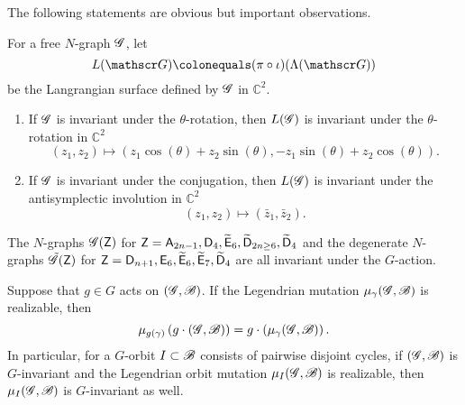 The following statements are obvious but important observations.
\begin{lemma}\label{lemma:Lagrangian fillings with symmetry}
For a free $N$-graph $\mathscr{G}$, let
\[
L(\ngraph)\colonequals(\pi\circ\iota)(\Legendrian(\ngraph))
\]
be the Langrangian surface defined by $\mathscr{G}$ in $\mathbb{C}^2$.
\begin{enumerate}
\item If $\mathscr{G}$ is invariant under the $\theta$-rotation, then $L(\mathscr{G})$ is invariant under the $\theta$-rotation in $\mathbb{C}^2$
\[
(z_1,z_2)\mapsto (z_1\cos(\theta) +z_2\sin(\theta), -z_1\sin(\theta)+z_2\cos(\theta)).
\]
\item If $\mathscr{G}$ is invariant under the conjugation, then $L(\mathscr{G})$ is invariant under the antisymplectic involution in $\mathbb{C}^2$
\[
(z_1,z_2)\mapsto (\bar z_1, \bar z_2).
\]
\end{enumerate}
\end{lemma}

\begin{lemma}\label{lemma:initial Ngraphs are G-invariant}
The $N$-graphs $\mathscr{G}(\mathsf{Z})$ for $\mathsf{Z}=\mathsf{A}_{2n-1}, \mathsf{D}_4, \widetilde{\mathsf{E}}_6, \widetilde{\mathsf{D}}_{2n\ge 6}, \widetilde{\mathsf{D}}_4$ and the degenerate $N$-graphs $\tilde{\mathscr{G}}(\mathsf{Z})$ for $\mathsf{Z}=\mathsf{D}_{n+1}, \mathsf{E}_6, \widetilde{\mathsf{E}}_6, \widetilde{\mathsf{E}}_7, \widetilde{\mathsf{D}}_4$ are all invariant under the $G$-action.
\end{lemma}



\begin{lemma}\label{lemma:mutation preserves invariance}
Suppose that $g\in G$ acts on $(\mathscr{G}, \mathscr{B})$.
If the Legendrian mutation $\mu_{\gamma}(\mathscr{G}, \mathscr{B})$ is realizable, then
\[
\mu_{g(\gamma)}\left(g\cdot(\mathscr{G},\mathscr{B})\right) = g\cdot\left(\mu_{\gamma}(\mathscr{G},\mathscr{B})\right).
\]
In particular, for a $G$-orbit $I\subset\mathscr{B}$ consists of pairwise disjoint cycles, if $(\mathscr{G},\mathscr{B})$ is $G$-invariant and the Legendrian orbit mutation $\mu_{I}(\mathscr{G},\mathscr{B})$ is realizable, then $\mu_I(\mathscr{G},\mathscr{B})$ is $G$-invariant as well.
\end{lemma}


